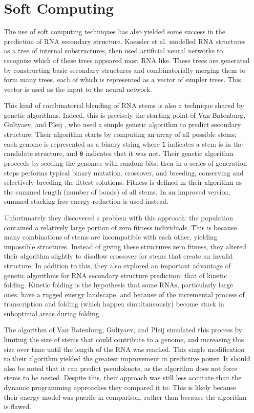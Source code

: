 \documentclass{cshonours}
\begin{document}
\section{Soft Computing}
The use of soft computing techniques has also yielded some success in the prediction of RNA secondary structure. Koessler et al. \cite{koessler2010predictive} modelled RNA structures
as a tree of internal substructures, then used artificial neural networks to recognize
which of these trees appeared most RNA like. These trees are generated by constructing basic secondary structures and combinatorially merging them to form many trees, each of which is represented as a vector of simpler trees.
This vector is used as the input to the neural network. 

This kind of combinatorial blending of RNA stems is also a technique shared by genetic algorithms. Indeed, this
is precisely the starting point of Van Batenburg, Gultyaev, and Pleij \cite{van1995apl}, who
used a simple genetic algorithm to predict secondary structure. Their algorithm
starts by computing an array of all possible stems; each genome is represented
as a binary string where \texttt{1} indicates a stem is in the candidate structure, and \texttt{0}
indicates that it was not. Their genetic algorithm proceeds by seeding the genomes
with random bits, then in a series of generation steps performs typical binary
mutation, crossover, and breeding, conserving and selectively breeding the fittest
solutions. Fitness is defined in their algorithm as the summed length
(number of bonds) of all stems. In an improved version, summed stacking
free energy reduction is used instead.

Unfortunately they discovered a problem with this approach: the population
contained a relatively large portion of zero fitness individuals. This is because
many combinations of stems are incompatible with each other, yielding impossible
structures. Instead of giving these structures zero fitness, they altered their algorithm slightly to disallow crossover for stems that create an invalid structure.
In addition to this, they also explored an important advantage of genetic algorithms for RNA secondary structure prediction: that of kinetic folding. Kinetic
folding is the hypothesis that some RNAs, particularly large ones, have a rugged
energy landscape, and because of the incremental process of transcription and
folding (which happen simultaneously) become stuck in suboptimal areas during
folding \cite{treiber2001beyond, van1995apl}. 

The algorithm of Van Batenburg, Gultyaev, and Pleij simulated
this process by limiting the size of stems that could contribute to a genome, and
increasing this size over time until the length of the RNA was reached. This
single modification to their algorithm yielded the greatest improvement in predictive power. It should also be noted that it can predict pseudoknots, as
the algorithm does not force stems to be nested. Despite this, their approach was
still less accurate than the dynamic programming approaches they compared it
to. This is likely because their energy model was puerile in comparison, rather than because the algorithm is flawed.
\end{document}

